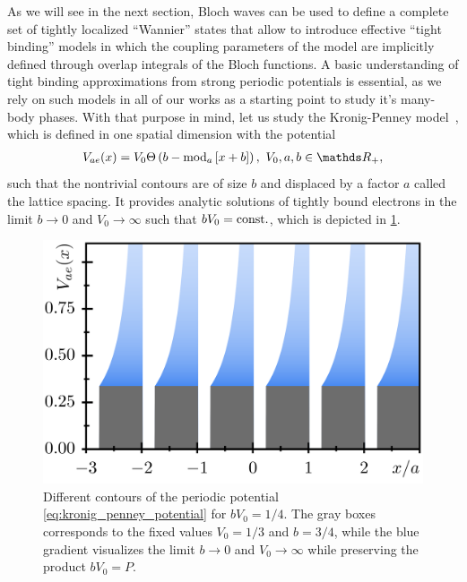 As we will see in the next section, Bloch waves can be used to define a complete set of tightly localized ``Wannier'' states that allow to introduce effective ``tight binding'' models in which the coupling parameters of the model are implicitly defined through overlap integrals of the Bloch functions.
A basic understanding of tight binding approximations from strong periodic potentials is essential, as we rely on such models in all of our works as a starting point to study it's many-body phases.
With that purpose in mind, let us study the Kronig-Penney model~\cite{KronigPenney1931}, which is defined in one spatial dimension with the potential
\begin{align}
    V_{ae}(x) = V_0 \Theta\brlr{b-{\rm mod}_{a}\commutator{x+b}},\ V_0,a,b\in\mathds R_+,
    \label{eq:kronig_penney_potential}
\end{align}
such that the nontrivial contours are of size $b$ and displaced by a factor $a$ called the lattice spacing.
It provides analytic solutions of tightly bound electrons in the limit $b\rightarrow0$ and $V_0\rightarrow\infty$ such that $bV_0={\rm const.}$, which is depicted in \cref{fig:kronig_penney_potential}.
\begin{figure}
    \centering
    \includegraphics{figures/kronig_penney_potential.png}
    \caption{Different contours of the periodic potential \cref{eq:kronig_penney_potential} for $bV_0=1/4$. The gray boxes corresponds to the fixed values $V_0=1/3$ and $b=3/4$, while the blue gradient visualizes the limit $b\rightarrow0$ and $V_0\rightarrow\infty$ while preserving the product $bV_0=P$.}
    \label{fig:kronig_penney_potential}
\end{figure}

